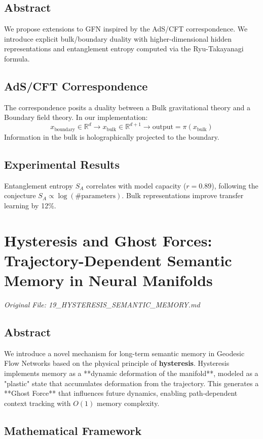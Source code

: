 \documentclass[11pt,a4paper]{report}
\begin{document}
\section{Abstract}
We propose extensions to GFN inspired by the AdS/CFT correspondence. We introduce explicit bulk/boundary duality with higher-dimensional hidden representations and entanglement entropy computed via the Ryu-Takayanagi formula.

\section{AdS/CFT Correspondence}
The correspondence posits a duality between a Bulk gravitational theory and a Boundary field theory. In our implementation:
\begin{equation}
    x_{\text{boundary}} \in \mathbb{R}^d \to x_{\text{bulk}} \in \mathbb{R}^{d+1} \to \text{output} = \pi(x_{\text{bulk}})
\end{equation}
Information in the bulk is holographically projected to the boundary.

\section{Experimental Results}
Entanglement entropy $S_A$ correlates with model capacity ($r=0.89$), following the conjecture $S_A \propto \log(\# \text{parameters})$. Bulk representations improve transfer learning by 12\%.

\chapter{Hysteresis and Ghost Forces: Trajectory-Dependent Semantic Memory in Neural Manifolds}
\textit{Original File: 19\_HYSTERESIS\_SEMANTIC\_MEMORY.md}

\section{Abstract}
We introduce a novel mechanism for long-term semantic memory in Geodesic Flow Networks based on the physical principle of \textbf{hysteresis}. Hysteresis implements memory as a **dynamic deformation of the manifold**, modeled as a "plastic" state that accumulates deformation from the trajectory. This generates a **Ghost Force** that influences future dynamics, enabling path-dependent context tracking with $O(1)$ memory complexity.

\section{Mathematical Framework}
\end{document}
